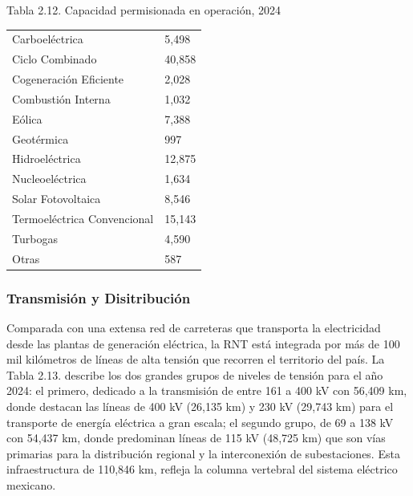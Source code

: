 \documentclass{sener2025}
\begin{document}
\begin{tabladoradoCorto}
  \caption{Tabla 2.12. Capacidad permisionada en operación, 2024}
  \label{tab:tabla_2_12__capacidad_permisio}
  \begin{tabularx}{\textwidth}{Vv}
    \toprule
      &  \\
    \midrule
    Carboeléctrica & 5,498 \\
    Ciclo Combinado & 40,858 \\
    Cogeneración Eficiente & 2,028 \\
    Combustión Interna & 1,032 \\
    Eólica & 7,388 \\
    Geotérmica & 997 \\
    Hidroeléctrica & 12,875 \\
    Nucleoeléctrica & 1,634 \\
    Solar Fotovoltaica & 8,546 \\
    Termoeléctrica Convencional & 15,143 \\
    Turbogas & 4,590 \\
    Otras & 587 \\
    \bottomrule
  \end{tabularx}
\end{tabladoradoCorto}
\vspace{-4pt}



\subsubsection{Transmisión y Disitribución}

Comparada con una extensa red de carreteras que transporta la electricidad desde las plantas de generación eléctrica, la RNT está integrada por más de 100 mil kilómetros de líneas de alta tensión que recorren el territorio del país. La Tabla 2.13. describe los dos grandes grupos de niveles de tensión para el año 2024: el primero, dedicado a la transmisión de entre 161 a 400 kV con 56,409 km, donde destacan las líneas de 400 kV (26,135 km) y 230 kV (29,743 km) para el transporte de energía eléctrica a gran escala; el segundo grupo, de 69 a 138 kV con 54,437 km, donde predominan líneas de 115 kV (48,725 km) que son vías primarias para la distribución regional y la interconexión de subestaciones. Esta infraestructura de 110,846 km, refleja la columna vertebral del sistema eléctrico mexicano.
\end{document}
